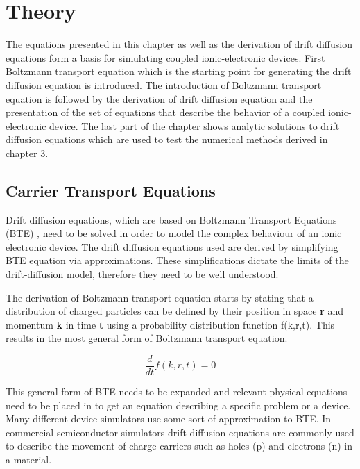 
\chapter{Theory} %

\label{Chapter2} %

\begin{doublespace}

The equations presented in this chapter as well as the derivation of drift diffusion equations form a basis for simulating coupled ionic-electronic devices. First Boltzmann transport equation which is the starting point for generating the drift diffusion equation is introduced. The introduction of Boltzmann transport equation is followed by the derivation of drift diffusion equation and the presentation of the set of equations that describe the behavior of a coupled ionic-electronic device. The last part of the chapter shows analytic solutions to drift diffusion equations which are used to test the numerical methods derived in chapter 3.   

\section{Carrier Transport Equations}
Drift diffusion equations, which are based on Boltzmann Transport Equations (BTE) \cite{Dragica1}, need to be solved in order to model the complex behaviour of an ionic electronic device. The drift diffusion equations used are derived by simplifying BTE equation via approximations. These simplifications dictate the limits of the drift-diffusion model, therefore they need to be well understood.

The derivation of Boltzmann transport equation starts by stating that a distribution of charged particles can be defined by their position in space \textbf{r} and momentum \textbf{k} in time \textbf{t} using a probability distribution function f(k,r,t). This results in the most general form of Boltzmann transport equation\cite{snowden}.

\begin{equation}
\frac{d }{dt}f(k,r,t)=0
\end{equation}

This general form of BTE needs to be expanded and relevant physical equations need to be placed in to get an equation describing a specific problem or a device. 
Many different device simulators use some sort of approximation to BTE. In commercial semiconductor simulators drift diffusion equations are commonly used to describe the movement of charge carriers such as holes (p) and electrons (n) in a material\cite{Comsol}\cite{SILVACO}\cite{LumDev}. 


\end{doublespace}
